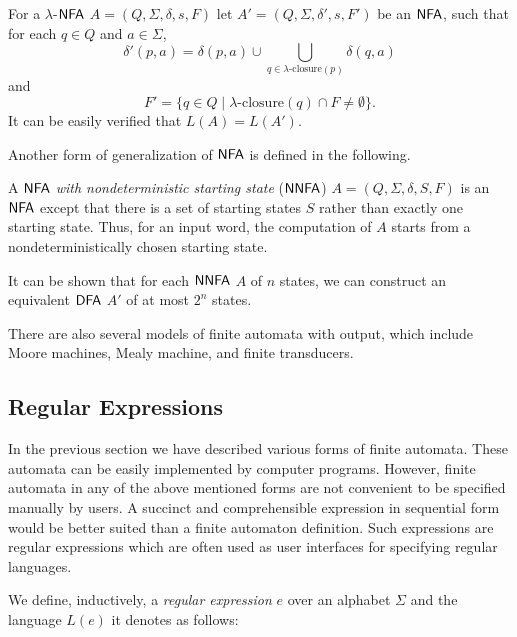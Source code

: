 For a $\lambda$-$\textup{\sf NFA}$ $A = (Q, \Sigma, \delta, s, F)$ let $A' = (Q, \Sigma, \delta', s, F')$ be an $\textup{\sf NFA}$, such that for each $q \in Q$ and $a \in \Sigma$,
$$\delta'(p, a) = \delta(p, a) \cup \bigcup_{q \in \lambda \text{-closure}(p)}\delta(q, a)$$
and
$$F' = \{ q \in Q \mid \lambda\text{-closure}(q) \cap F \neq \emptyset \}.$$
It can be easily verified that $L(A) = L(A')$.

Another form of generalization of $\textup{\sf NFA}$ is defined in the following.

A \emph{$\textup{\sf NFA}$ with nondeterministic starting state} \index{$\NNFA$}($\NNFA$) $A = (Q, \Sigma, \delta, S, F)$ is an $\textup{\sf NFA}$ except that there is a set of starting states $S$ rather than exactly one starting state. Thus, for an input word, the computation of $A$ starts from a nondeterministically chosen starting state.

It can be shown that for each $\NNFA$ $A$ of $n$ states, we can construct an equivalent $\textup{\sf DFA}$ $A'$ of at most $2^n$ states.

There are also several models of finite automata with output, which include Moore machines, Mealy machine, and finite transducers.

\subsection{Regular Expressions}
\label{subsection:regular-expressions}

In the previous section we have described various forms of finite automata. These automata can be easily implemented by computer programs. However, finite automata in any of the above mentioned forms are not convenient to be specified manually by users. A succinct and comprehensible expression in sequential form would be better suited than a finite automaton definition. Such expressions are regular expressions which are often used as user interfaces for specifying regular languages.

We define, inductively, a \emph{regular expression} $e$ over an alphabet $\Sigma$ and the language $L(e)$ it denotes as follows:

